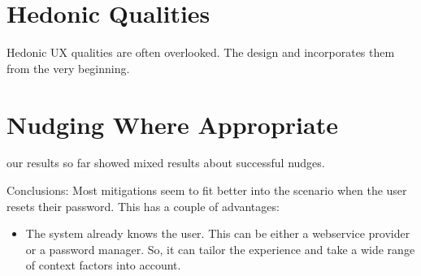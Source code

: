 \section{Hedonic Qualities}
Hedonic UX qualities are often overlooked. The design and incorporates them from the very beginning. 

\section{Nudging Where Appropriate}
our results so far showed mixed results about successful nudges. 



Conclusions: Most mitigations seem to fit better into the scenario when the user resets their password. This has a couple of advantages:
\begin{itemize}
	\item The system already knows the user. This can be either a webservice provider or a password manager. So, it can tailor the experience and take a wide range of context factors into account. 
\end{itemize}